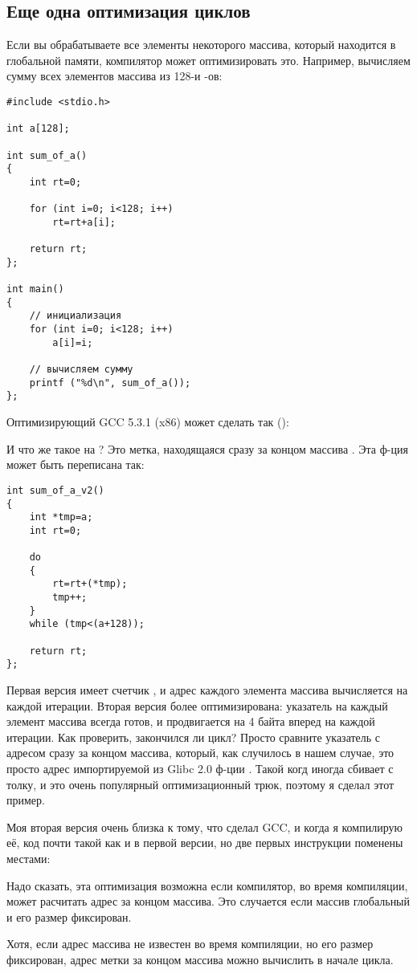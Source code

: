 \subsection{Еще одна оптимизация циклов}

Если вы обрабатываете все элементы некоторого массива, который находится в глобальной памяти, компилятор может оптимизировать
это.
Например, вычисляем сумму всех элементов массива из 128-и -ов:

\begin{lstlisting}[style=customc]
#include <stdio.h>

int a[128];

int sum_of_a()
{
	int rt=0;
	
	for (int i=0; i<128; i++)
		rt=rt+a[i];

	return rt;
};

int main()
{
	// инициализация
	for (int i=0; i<128; i++)
		a[i]=i;
	
	// вычисляем сумму
	printf ("%d\n", sum_of_a());
};
\end{lstlisting}

Оптимизирующий GCC 5.3.1 (x86) может сделать так (\IDA):



И что же такое  на ?
Это метка, находящаяся сразу за концом массива .
Эта ф-ция может быть переписана так:

\begin{lstlisting}[style=customc]
int sum_of_a_v2()
{
	int *tmp=a;
	int rt=0;
	
	do
	{
		rt=rt+(*tmp);
		tmp++;
	}
	while (tmp<(a+128));

	return rt;
};
\end{lstlisting}

Первая версия имеет счетчик , и адрес каждого элемента массива вычисляется на каждой итерации.
Вторая версия более оптимизирована: указатель на каждый элемент массива всегда готов, и продвигается на 4 байта вперед
на каждой итерации.
Как проверить, закончился ли цикл?
Просто сравните указатель с адресом сразу за концом массива, который, как случилось в нашем случае, это просто адрес
импортируемой из Glibc 2.0 ф-ции .
Такой когд иногда сбивает с толку, и это очень популярный оптимизационный трюк, поэтому я сделал этот пример.

Моя вторая версия очень близка к тому, что сделал GCC, и когда я компилирую её, код почти такой как и в первой версии,
но две первых инструкции поменены местами:



Надо сказать, эта оптимизация возможна если компилятор, во время компиляции, может расчитать адрес за концом массива.
Это случается если массив глобальный и его размер фиксирован.

Хотя, если адрес массива не известен во время компиляции, но его размер фиксирован, адрес метки за концом массива
можно вычислить в начале цикла.

